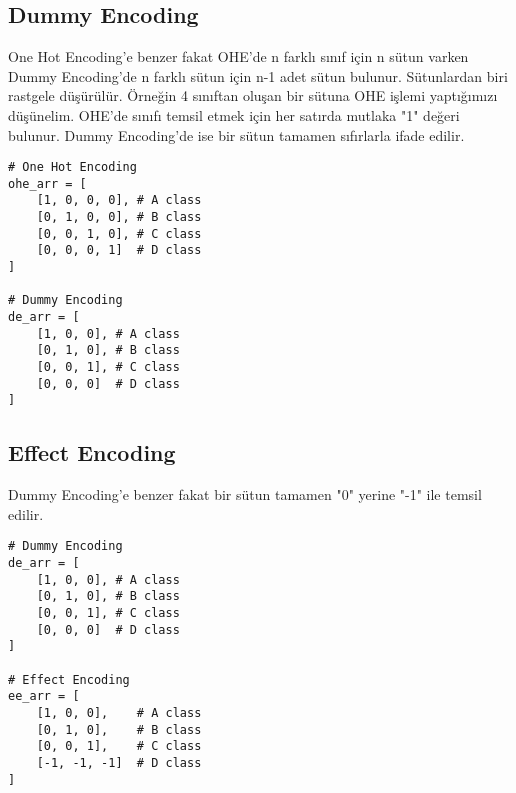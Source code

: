 \subsection{Dummy Encoding}
One Hot Encoding'e benzer fakat OHE'de n farklı sınıf için n sütun varken Dummy Encoding'de n farklı sütun için n-1 adet sütun bulunur. Sütunlardan biri rastgele düşürülür. Örneğin 4 sınıftan oluşan bir sütuna OHE işlemi yaptığımızı düşünelim. OHE'de sınıfı temsil etmek için her satırda mutlaka "1" değeri bulunur. Dummy Encoding'de ise bir sütun tamamen sıfırlarla ifade edilir.

\begin{lstlisting}
# One Hot Encoding
ohe_arr = [
    [1, 0, 0, 0], # A class
    [0, 1, 0, 0], # B class
    [0, 0, 1, 0], # C class
    [0, 0, 0, 1]  # D class
]

# Dummy Encoding
de_arr = [
    [1, 0, 0], # A class
    [0, 1, 0], # B class
    [0, 0, 1], # C class
    [0, 0, 0]  # D class
]
\end{lstlisting}

\subsection{Effect Encoding}
Dummy Encoding'e benzer fakat bir sütun tamamen "0" yerine "-1" ile temsil edilir.

\begin{lstlisting}
# Dummy Encoding
de_arr = [
    [1, 0, 0], # A class
    [0, 1, 0], # B class
    [0, 0, 1], # C class
    [0, 0, 0]  # D class
]

# Effect Encoding
ee_arr = [
    [1, 0, 0],    # A class
    [0, 1, 0],    # B class
    [0, 0, 1],    # C class
    [-1, -1, -1]  # D class
]
\end{lstlisting}

\newpage
